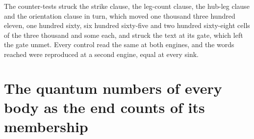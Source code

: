 \begin{chproof}[finite]
The counter-tests struck the strike clause, the leg-count clause, the hub-leg clause and the orientation clause in turn, which moved one thousand three hundred eleven, one hundred sixty, six hundred sixty-five and two hundred sixty-eight cells of the three thousand and some each, and struck the text at its gate, which left the gate unmet. Every control read the same at both engines, and the words reached were reproduced at a second engine, equal at every sink.
\end{chproof}
\par\medskip{}\label{narr:close:4-9}\par
\section{The quantum numbers of every body as the end counts of its membership}\label{mod:IV-11-quantum-numbers-of-every-body-as-the-end-counts-of-its-membership}
